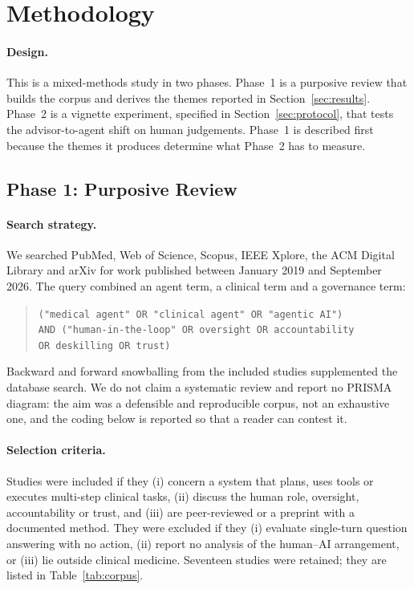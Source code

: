 \section{Methodology}
\label{sec:method}

\paragraph{Design.}
This is a mixed-methods study in two phases. Phase~1 is a purposive review that builds the corpus and derives the themes reported in Section~\ref{sec:results}. Phase~2 is a vignette experiment, specified in Section~\ref{sec:protocol}, that tests the advisor-to-agent shift on human judgements. Phase~1 is described first because the themes it produces determine what Phase~2 has to measure.

\subsection{Phase 1: Purposive Review}
\label{sec:review}

\paragraph{Search strategy.}
We searched PubMed, Web of Science, Scopus, IEEE Xplore, the ACM Digital Library and arXiv for work published between January 2019 and September 2026. The query combined an agent term, a clinical term and a governance term:
\begin{quote}\small
\texttt{("medical agent" OR "clinical agent" OR "agentic AI")\\
AND ("human-in-the-loop" OR oversight OR accountability\\
OR deskilling OR trust)}
\end{quote}
Backward and forward snowballing from the included studies supplemented the database search. We do not claim a systematic review and report no PRISMA diagram: the aim was a defensible and reproducible corpus, not an exhaustive one, and the coding below is reported so that a reader can contest it.

\paragraph{Selection criteria.}
Studies were included if they (i) concern a system that plans, uses tools or executes multi-step clinical tasks, (ii) discuss the human role, oversight, accountability or trust, and (iii) are peer-reviewed or a preprint with a documented method. They were excluded if they (i) evaluate single-turn question answering with no action, (ii) report no analysis of the human--AI arrangement, or (iii) lie outside clinical medicine. Seventeen studies were retained; they are listed in Table~\ref{tab:corpus}.

